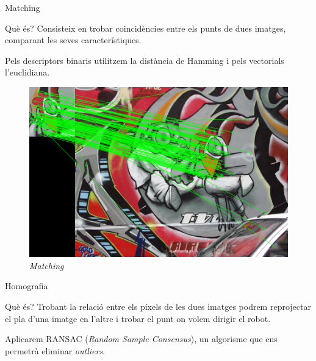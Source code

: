 \documentclass[xcolor=table, 11pt]{beamer}
\newcommand\tz{\fontsize{13}{15.6}\selectfont}
\begin{document}
	\begin{frame}{Matching}
		\tz
		\begin{minipage}{0.62\textwidth}
			\begin{block}{Què és?}
				Consisteix en trobar coincidències entre els punts de dues imatges, comparant les seves característiques.\par
				Pels descriptors binaris utilitzem la distància de Hamming i pels vectorials l'euclidiana.
			\end{block}
		\end{minipage}
		\hfill
		\begin{minipage}{0.36\textwidth}
			\begin{figure}[H]
				\vspace{0.8cm}
				\includegraphics[width=\textwidth]{images/matching}
				\caption{\textit{Matching}}
			\end{figure}
		\end{minipage}
	\end{frame}

	\begin{frame}{Homografia}
		\tz
		\begin{block}{Què és?}
			Trobant la relació entre els píxels de les dues imatges podrem reprojectar el pla d'una imatge en l'altre i trobar el punt on volem dirigir el robot.
		\end{block}
		Aplicarem RANSAC (\textit{Random Sample Consensus})\cite{Fischler:1981:RSC:358669.358692},
		un algorisme que ens permetrà eliminar \textit{outliers}.
	\end{frame}
\end{document}
